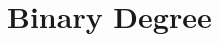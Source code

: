 \hypertarget{group___e_g_x_math-_angle_conversions-_binary_degree}{}\section{Binary Degree}
\label{group___e_g_x_math-_angle_conversions-_binary_degree}
